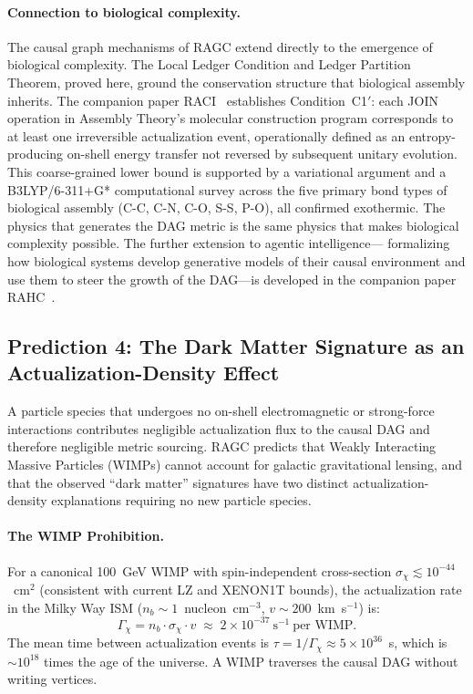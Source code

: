\documentclass[11pt,a4paper]{article}
\theoremstyle{plain}
\theoremstyle{definition}
\theoremstyle{remark}
\begin{document}
\paragraph{Connection to biological complexity.}
The causal graph mechanisms of RAGC extend directly to the emergence of biological
complexity. The Local Ledger Condition and Ledger Partition Theorem, proved here,
ground the conservation structure that biological assembly inherits. The companion
paper RACI~\citep{Sandeman2026c} establishes Condition~C1$'$: each JOIN operation
in Assembly Theory's molecular construction program corresponds to at least one
irreversible actualization event, operationally defined as an entropy-producing
on-shell energy transfer not reversed by subsequent unitary evolution. This
coarse-grained lower bound is supported by a variational argument and a
B3LYP/6-311+G* computational survey across the five primary bond types of
biological assembly (C-C, C-N, C-O, S-S, P-O), all confirmed exothermic.
The physics that generates the DAG metric is the same physics that makes
biological complexity possible. The further extension to agentic intelligence---
formalizing how biological systems develop generative models of their causal
environment and use them to steer the growth of the DAG---is developed in the
companion paper RAHC~\citep{Sandeman2026RAHC}.


\subsection{Prediction 4: The Dark Matter Signature as an Actualization-Density
Effect}
\label{sec:pred4}

A particle species that undergoes no on-shell electromagnetic or strong-force
interactions contributes negligible actualization flux to the causal DAG and
therefore negligible metric sourcing. RAGC predicts that Weakly Interacting
Massive Particles (WIMPs) cannot account for galactic gravitational lensing, and
that the observed ``dark matter'' signatures have two distinct actualization-density
explanations requiring no new particle species.

\paragraph{The WIMP Prohibition.}
For a canonical 100~GeV WIMP with spin-independent cross-section
$\sigma_\chi \lesssim 10^{-44}$~cm$^2$ (consistent with current LZ and XENON1T
bounds), the actualization rate in the Milky Way ISM
($n_b \sim 1$~nucleon~cm$^{-3}$, $v \sim 200$~km~s$^{-1}$) is:
\begin{equation}
  \Gamma_\chi = n_b \cdot \sigma_\chi \cdot v
  \;\approx\; 2 \times 10^{-37}~\text{s}^{-1}~\text{per WIMP.}
  \label{eq:wimp_rate}
\end{equation}
The mean time between actualization events is $\tau = 1/\Gamma_\chi \approx
5 \times 10^{36}$~s, which is $\sim\!10^{18}$ times the age of the universe.
A WIMP traverses the causal DAG without writing vertices.
\end{document}
